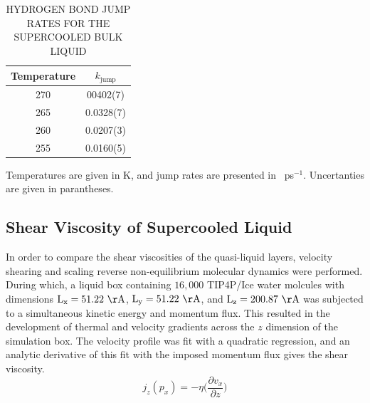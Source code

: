 \begin{table}[h] \centering \caption{HYDROGEN BOND JUMP RATES FOR THE
    SUPERCOOLED BULK LIQUID\label{tab:bulkVisco}}
\begin{tabular}{cc}
\hline
\hline
 Temperature & $k_\mathrm{jump}$ \\
\hline
270 & 00402(7) \\
265 & 0.0328(7) \\
260 & 0.0207(3)  \\
255 & 0.0160(5) \\
\hline
\hline
\end{tabular}
\begin{flushleft}
  Temperatures are given in K, and jump rates are presented in
  ~ps$^{-1}$. Uncertanties are given in parantheses.
\end{flushleft}
\end{table}

           

\subsection{Shear Viscosity of Supercooled Liquid}
In order to compare the shear viscosities of the quasi-liquid layers,
velocity shearing and scaling reverse non-equilibrium molecular
dynamics were performed. During which, a liquid box containing
$16,000$ TIP4P/Ice water molcules with dimensions
$\mathrm{L_x} = 51.22~\mathrm{\AA}$,
$\mathrm{L_y} = 51.22~\mathrm{\AA}$, and
$\mathrm{L_z}=200.87~\mathrm{\AA}$ was subjected to a simultaneous
kinetic energy and momentum flux. This resulted in the development of
thermal and velocity gradients across the $z$ dimension of the
simulation box. The velocity profile was fit with a quadratic
regression, and an analytic derivative of this fit with the imposed
momentum flux gives the shear viscosity.
\begin{equation}\label{eq:viscosity}
  j_{z}(p_{x}) = -\eta \big(\frac{\partial v_{x}}{\partial z}\big)
\end{equation}


